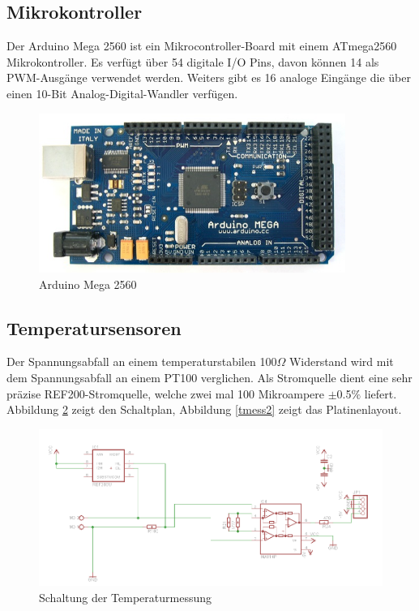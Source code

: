 \documentclass[a4paper,bibtotoc,oneside]{scrbook}
\begin{document}
 
\subsection{Mikrokontroller}\thispagestyle{empty}
Der Arduino Mega 2560 ist ein Mikrocontroller-Board mit einem ATmega2560 Mikrokontroller. Es verfügt über 54 digitale I/O Pins, davon können 14 als PWM-Ausgänge verwendet werden. Weiters gibt es 16 analoge Eingänge die über einen 10-Bit Analog-Digital-Wandler verfügen.


\begin{figure}[htbp]
\centering
\includegraphics[width=100mm]{img/ArduinoMega.jpg}
\caption[Arduino Mega 2560]{Arduino Mega 2560}\label{ardu}
\end{figure}

\subsection{Temperatursensoren}\thispagestyle{empty}
Der Spannungsabfall an einem temperaturstabilen 100$\Omega$ Widerstand wird mit dem Spannungsabfall an einem PT100 verglichen. Als Stromquelle dient eine sehr präzise REF200-Stromquelle\cite{ref200}, welche zwei mal 100 Mikroampere $\pm$0.5$\%$ liefert. Abbildung \ref{tmess} zeigt den Schaltplan, Abbildung \ref{tmess2} zeigt das Platinenlayout.


\begin{figure}[htbp]
\centering
\includegraphics[width=125mm]{img/tmess.png}
\caption{Schaltung der Temperaturmessung}\label{tmess}
\end{figure}
\end{document}
